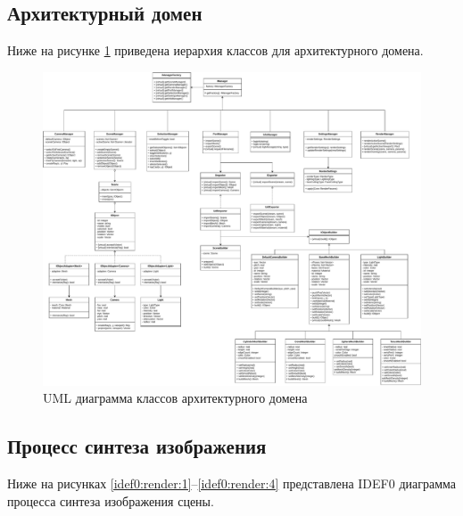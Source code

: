\clearpage

\subsection{Архитектурный домен}

Ниже на рисунке \ref{uml:arch} приведена иерархия классов для архитектурного домена.

\begin{figure}
	\centering
	\includegraphics[angle=90,origin=c,width=\linewidth,height=0.85\textheight,keepaspectratio]{diagrams/uml.pdf}
	\caption{UML диаграмма классов архитектурного домена}
	\label{uml:arch}
\end{figure}

\clearpage

\subsection{Процесс синтеза изображения}

Ниже на рисунках \ref{idef0:render:1}--\ref{idef0:render:4} представлена IDEF0 диаграмма процесса синтеза изображения сцены.

